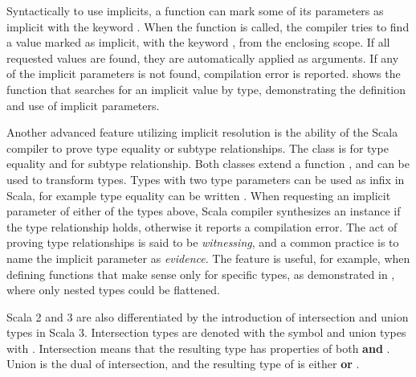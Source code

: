 Syntactically to use implicits, a function can mark some of its parameters as implicit with the keyword . When the function is called, the compiler tries to find a value marked as implicit, with the keyword , from the enclosing scope. If all requested values are found, they are automatically applied as arguments. If any of the implicit parameters is not found, compilation error is reported.  shows the function  that searches for an implicit value by type, demonstrating the definition and use of implicit parameters.



Another advanced feature utilizing implicit resolution is the ability of the Scala compiler to prove type equality or subtype relationships. The class \inlinescala{=:=[From, To]} is for type equality and \inlinescala{<:<[From, To]} for subtype relationship. Both classes extend a function , and can be used to transform types. Types with two type parameters can be used as infix in Scala, for example type equality can be written . When requesting an implicit parameter of either of the types above, Scala compiler synthesizes an instance if the type relationship holds, otherwise it reports a compilation error. The act of proving type relationships is said to be \emph{witnessing}, and a common practice is to name the implicit parameter as \emph{evidence}. The feature is useful, for example, when defining functions that make sense only for specific types, as demonstrated in , where only nested  types could be flattened.



Scala 2 and 3 are also differentiated by the introduction of intersection and union types in Scala 3. Intersection types are denoted with the \inlinecode{&} symbol and union types with \inlinecode{|}. Intersection  means that the resulting type has properties of both  \textbf{and} . Union is the dual of intersection, and the resulting type of  is either  \textbf{or} .

